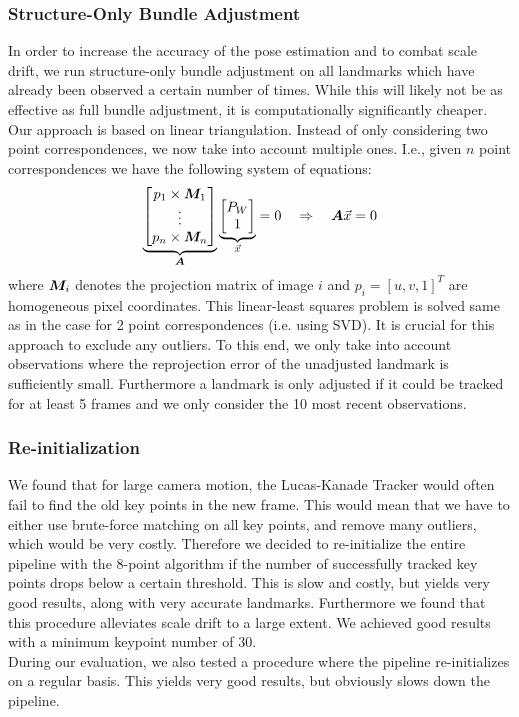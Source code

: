\documentclass[11pt]{article}
\newcommand{\mat}{\matrixsym}
\begin{document}
\subsubsection{Structure-Only Bundle Adjustment}
In order to increase the accuracy of the pose estimation and to combat scale drift, we run structure-only bundle adjustment on all landmarks which have already been observed a certain number of times. While this will likely not be as effective as full bundle adjustment, it is computationally significantly cheaper.\\
Our approach is based on linear triangulation. Instead of only considering two point correspondences, we now take into account multiple ones. I.e., given $n$ point correspondences we have the following system of equations:
\begin{equation*}
\underbrace{\begin{bmatrix} p_1\times \mat{M}_1\\ \vdots \\ p_n\times \mat{M}_n \end{bmatrix}}_{\mat{A}} \underbrace{\begin{bmatrix} P_W \\ 1 \end{bmatrix}}_{\vec{x}} = 0 \quad \Rightarrow \quad \mat{A} \vec{x} = 0
\end{equation*}
where $\mat{M}_i$ denotes the projection matrix of image $i$ and $p_i = [u,v,1]^T$ are homogeneous pixel coordinates. This linear-least squares problem is solved same as in the case for 2 point correspondences (i.e. using SVD). It is crucial for this approach to exclude any outliers. To this end, we only take into account observations where the reprojection error of the unadjusted landmark is sufficiently small. Furthermore a landmark is only adjusted if it could be tracked for at least 5 frames and we only consider the 10 most recent observations.

\subsubsection{Re-initialization}
We found that for large camera motion, the Lucas-Kanade Tracker would often fail to find the old key points in the new frame. This would mean that we have to either use brute-force matching on all key points, and remove many outliers, which would be very costly. Therefore we decided to re-initialize the entire pipeline with the 8-point algorithm if the number of successfully tracked key points drops below a certain threshold. This is slow and costly, but yields very good results, along with very accurate landmarks. Furthermore we found that this procedure alleviates scale drift to a large extent. We achieved good results with a minimum keypoint number of 30.\\
During our evaluation, we also tested a procedure where the pipeline re-initializes on a regular basis. This yields very good results, but obviously slows down the pipeline.
\end{document}
